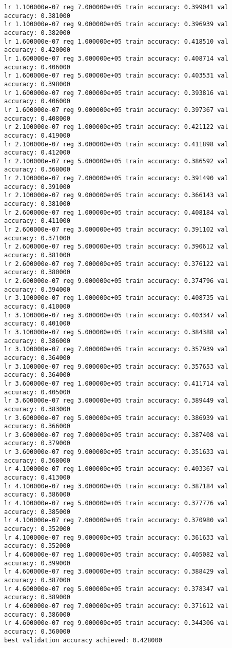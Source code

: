 \documentclass[11pt]{article}
\begin{document}
\begin{Verbatim}[commandchars=\\\{\}]
lr 1.100000e-07 reg 7.000000e+05 train accuracy: 0.399041 val accuracy: 0.381000
lr 1.100000e-07 reg 9.000000e+05 train accuracy: 0.396939 val accuracy: 0.382000
lr 1.600000e-07 reg 1.000000e+05 train accuracy: 0.418510 val accuracy: 0.420000
lr 1.600000e-07 reg 3.000000e+05 train accuracy: 0.408714 val accuracy: 0.406000
lr 1.600000e-07 reg 5.000000e+05 train accuracy: 0.403531 val accuracy: 0.398000
lr 1.600000e-07 reg 7.000000e+05 train accuracy: 0.393816 val accuracy: 0.406000
lr 1.600000e-07 reg 9.000000e+05 train accuracy: 0.397367 val accuracy: 0.408000
lr 2.100000e-07 reg 1.000000e+05 train accuracy: 0.421122 val accuracy: 0.419000
lr 2.100000e-07 reg 3.000000e+05 train accuracy: 0.411898 val accuracy: 0.412000
lr 2.100000e-07 reg 5.000000e+05 train accuracy: 0.386592 val accuracy: 0.368000
lr 2.100000e-07 reg 7.000000e+05 train accuracy: 0.391490 val accuracy: 0.391000
lr 2.100000e-07 reg 9.000000e+05 train accuracy: 0.366143 val accuracy: 0.381000
lr 2.600000e-07 reg 1.000000e+05 train accuracy: 0.408184 val accuracy: 0.411000
lr 2.600000e-07 reg 3.000000e+05 train accuracy: 0.391102 val accuracy: 0.371000
lr 2.600000e-07 reg 5.000000e+05 train accuracy: 0.390612 val accuracy: 0.381000
lr 2.600000e-07 reg 7.000000e+05 train accuracy: 0.376122 val accuracy: 0.380000
lr 2.600000e-07 reg 9.000000e+05 train accuracy: 0.374796 val accuracy: 0.394000
lr 3.100000e-07 reg 1.000000e+05 train accuracy: 0.408735 val accuracy: 0.410000
lr 3.100000e-07 reg 3.000000e+05 train accuracy: 0.403347 val accuracy: 0.401000
lr 3.100000e-07 reg 5.000000e+05 train accuracy: 0.384388 val accuracy: 0.386000
lr 3.100000e-07 reg 7.000000e+05 train accuracy: 0.357939 val accuracy: 0.364000
lr 3.100000e-07 reg 9.000000e+05 train accuracy: 0.357653 val accuracy: 0.364000
lr 3.600000e-07 reg 1.000000e+05 train accuracy: 0.411714 val accuracy: 0.405000
lr 3.600000e-07 reg 3.000000e+05 train accuracy: 0.389449 val accuracy: 0.383000
lr 3.600000e-07 reg 5.000000e+05 train accuracy: 0.386939 val accuracy: 0.366000
lr 3.600000e-07 reg 7.000000e+05 train accuracy: 0.387408 val accuracy: 0.379000
lr 3.600000e-07 reg 9.000000e+05 train accuracy: 0.351633 val accuracy: 0.368000
lr 4.100000e-07 reg 1.000000e+05 train accuracy: 0.403367 val accuracy: 0.413000
lr 4.100000e-07 reg 3.000000e+05 train accuracy: 0.387184 val accuracy: 0.386000
lr 4.100000e-07 reg 5.000000e+05 train accuracy: 0.377776 val accuracy: 0.385000
lr 4.100000e-07 reg 7.000000e+05 train accuracy: 0.370980 val accuracy: 0.352000
lr 4.100000e-07 reg 9.000000e+05 train accuracy: 0.361633 val accuracy: 0.352000
lr 4.600000e-07 reg 1.000000e+05 train accuracy: 0.405082 val accuracy: 0.399000
lr 4.600000e-07 reg 3.000000e+05 train accuracy: 0.388429 val accuracy: 0.387000
lr 4.600000e-07 reg 5.000000e+05 train accuracy: 0.378347 val accuracy: 0.389000
lr 4.600000e-07 reg 7.000000e+05 train accuracy: 0.371612 val accuracy: 0.386000
lr 4.600000e-07 reg 9.000000e+05 train accuracy: 0.344306 val accuracy: 0.360000
best validation accuracy achieved: 0.428000
    \end{Verbatim}
\end{document}
